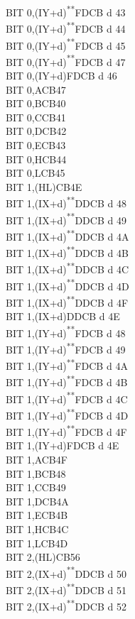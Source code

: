 \documentclass[twoside,openright,a4paper]{book}
\newcommand{\UNDOC}{\textnormal{\textsuperscript{**}}}
\begin{document}
\begin{multicols}{3}
{\begin{tabbing}
	BIT 0,(IY+d)\UNDOC\>FDCB d 43\\
	BIT 0,(IY+d)\UNDOC\>FDCB d 44\\
	BIT 0,(IY+d)\UNDOC\>FDCB d 45\\
	BIT 0,(IY+d)\UNDOC\>FDCB d 47\\
	BIT 0,(IY+d)\>FDCB d 46\\
	BIT 0,A\>CB47\\
	BIT 0,B\>CB40\\
	BIT 0,C\>CB41\\
	BIT 0,D\>CB42\\
	BIT 0,E\>CB43\\
	BIT 0,H\>CB44\\
	BIT 0,L\>CB45\\
	BIT 1,(HL)\>CB4E\\
	BIT 1,(IX+d)\UNDOC\>DDCB d 48\\
	BIT 1,(IX+d)\UNDOC\>DDCB d 49\\
	BIT 1,(IX+d)\UNDOC\>DDCB d 4A\\
	BIT 1,(IX+d)\UNDOC\>DDCB d 4B\\
	BIT 1,(IX+d)\UNDOC\>DDCB d 4C\\
	BIT 1,(IX+d)\UNDOC\>DDCB d 4D\\
	BIT 1,(IX+d)\UNDOC\>DDCB d 4F\\
	BIT 1,(IX+d)\>DDCB d 4E\\
	BIT 1,(IY+d)\UNDOC\>FDCB d 48\\
	BIT 1,(IY+d)\UNDOC\>FDCB d 49\\
	BIT 1,(IY+d)\UNDOC\>FDCB d 4A\\
	BIT 1,(IY+d)\UNDOC\>FDCB d 4B\\
	BIT 1,(IY+d)\UNDOC\>FDCB d 4C\\
	BIT 1,(IY+d)\UNDOC\>FDCB d 4D\\
	BIT 1,(IY+d)\UNDOC\>FDCB d 4F\\
	BIT 1,(IY+d)\>FDCB d 4E\\
	BIT 1,A\>CB4F\\
	BIT 1,B\>CB48\\
	BIT 1,C\>CB49\\
	BIT 1,D\>CB4A\\
	BIT 1,E\>CB4B\\
	BIT 1,H\>CB4C\\
	BIT 1,L\>CB4D\\
	BIT 2,(HL)\>CB56\\
	BIT 2,(IX+d)\UNDOC\>DDCB d 50\\
	BIT 2,(IX+d)\UNDOC\>DDCB d 51\\
	BIT 2,(IX+d)\UNDOC\>DDCB d 52\\

\end{tabbing}}
\end{multicols}
\end{document}
